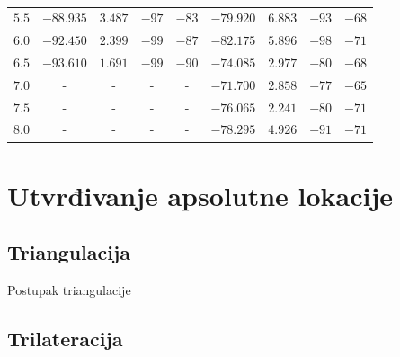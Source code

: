 \begin{table}[H]
\begin{tabular}{|c|cccc||cccc|}
	$5.5$ & $-88.935$ & $3.487$ & $-97$ & $-83$ & $-79.920$ & $6.883$ & $-93$ & $-68$ \\ %
	$6.0$ & $-92.450$ & $2.399$ & $-99$ & $-87$ & $-82.175$ & $5.896$ & $-98$ & $-71$ \\ %
	$6.5$ & $-93.610$ & $1.691$ & $-99$ & $-90$ & $-74.085$ & $2.977$ & $-80$ & $-68$ \\ %
	$7.0$ & - & - & - & - & $-71.700$ & $2.858$ & $-77$ & $-65$ \\ %
	$7.5$ & - & - & - & - & $-76.065$ & $2.241$ & $-80$ & $-71$ \\ %
	$8.0$ & - & - & - & - & $-78.295$ & $4.926$ & $-91$ & $-71$ \\ %
	\hline 
	\end{tabular}
	\caption*{}
\end{table}


\section*{Utvrđivanje apsolutne lokacije}

\subsection*{Triangulacija}

Postupak triangulacije

\subsection*{Trilateracija}

